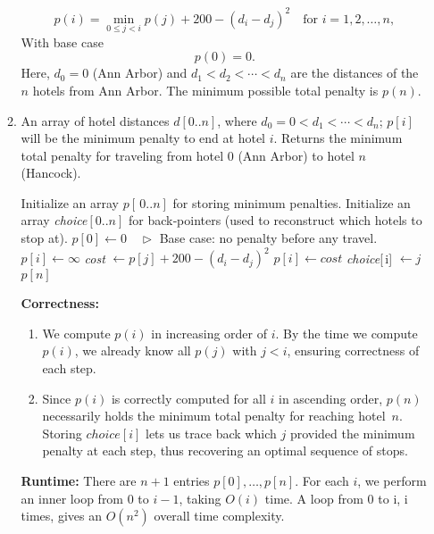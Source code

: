 \documentclass{article}
\begin{document}
\begin{enumerate}
\begin{enumerate}
        \[
        p(i)  =  \min_{0 \le j < i}  p(j)  +  200 - (d_i - d_j)^2
        \quad 
        \text{for } i = 1, 2, \ldots, n,
        \]
        With base case
        \[
        p(0) = 0.
        \]
        Here, $d_0 = 0$ (Ann Arbor) and $d_1 < d_2 < \cdots < d_n$ are the distances of the $n$ hotels from Ann Arbor. The minimum possible total penalty is $p(n)$. \\
    
        \item \begin{algorithm}
            \begin{algorithmic}[1]
            \Require An array of hotel distances $d[0..n]$, where $d_0=0 < d_1 < \cdots < d_n$; $p[i]$ will be the minimum penalty to end at hotel $i$.
            \Ensure Returns the minimum total penalty for traveling from hotel 0 (Ann Arbor) to hotel $n$ (Hancock).

            \State Initialize an array $p[\,0..n]$ for storing minimum penalties.
            \State Initialize an array \textit{choice}$[0..n]$ for back‐pointers (used to reconstruct which hotels to stop at).
            \State $p[0] \gets 0 \quad \triangleright$ Base case: no penalty before any travel.
                \State $p[i] \gets \infty$
                    \State \textit{cost} $\gets p[j] + 200 - (d_i - d_j)^2$
                        \State $p[i] \gets \textit{cost}$
                        \State \textit{choice}[\,i] $\gets j$
                    \EndIf
                \EndFor
            \EndFor
            \State \Return $p[n]$
        \end{algorithmic}
        \end{algorithm}
        \pagebreak
        \textbf{Correctness:}
        \begin{enumerate}
            \item We compute $p(i)$ in increasing order of $i$.  By the time we compute $p(i)$, we already know all $p(j)$ with $j < i$, ensuring correctness of each step.
            \item Since $p(i)$ is correctly computed for all $i$ in ascending order, $p(n)$ necessarily holds the minimum total penalty for reaching hotel~$n$.  Storing $\mathit{choice}[i]$ lets us trace back which $j$ provided the minimum penalty at each step, thus recovering an optimal sequence of stops.
        \end{enumerate}
        \textbf{Runtime:} There are $n+1$ entries $p[0],\dots,p[n]$.  For each $i$, we perform an inner loop from $0$ to $i-1$, taking $O(i)$ time.  A loop from 0 to i, i times, gives an $O(n^2)$ overall time complexity.
    \end{enumerate}
    




\end{enumerate}
\end{document}
